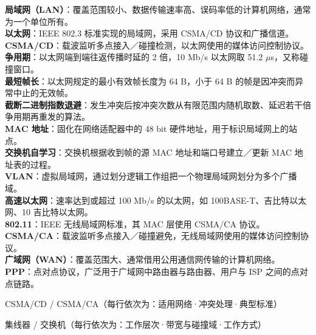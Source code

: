 \documentclass[a4paper,11pt]{article}
\begin{document}
\begin{keyterms}
\textbf{局域网（LAN）}：覆盖范围较小、数据传输速率高、误码率低的计算机网络，通常为一个单位所有。\\
\textbf{以太网}：IEEE 802.3 标准实现的局域网，采用 CSMA/CD 协议和广播信道。\\
\textbf{CSMA/CD}：载波监听多点接入／碰撞检测，以太网使用的媒体访问控制协议。\\
\textbf{争用期}：以太网端到端往返传播时延的 2 倍，10 Mb/s 以太网取 51.2 $\mu$s，又称碰撞窗口。\\
\textbf{最短帧长}：以太网规定的最小有效帧长度为 64 B，小于 64 B 的帧是因冲突而异常中止的无效帧。\\
\textbf{截断二进制指数退避}：发生冲突后按冲突次数从有限范围内随机取数、延迟若干倍争用期再重发的算法。\\
\textbf{MAC 地址}：固化在网络适配器中的 48 bit 硬件地址，用于标识局域网上的站点。\\
\textbf{交换机自学习}：交换机根据收到帧的源 MAC 地址和端口号建立／更新 MAC 地址表的过程。\\
\textbf{VLAN}：虚拟局域网，通过划分逻辑工作组把一个物理局域网划分为多个广播域。\\
\textbf{高速以太网}：速率达到或超过 100 Mb/s 的以太网，如 100BASE-T、吉比特以太网、10 吉比特以太网。\\
\textbf{802.11}：IEEE 无线局域网标准，其 MAC 层使用 CSMA/CA 协议。\\
\textbf{CSMA/CA}：载波监听多点接入／碰撞避免，无线局域网使用的媒体访问控制协议。\\
\textbf{广域网（WAN）}：覆盖范围大、通常借用公用通信网传输的计算机网络。\\
\textbf{PPP}：点对点协议，广泛用于广域网中路由器与路由器、用户与 ISP 之间的点对点链路。
\end{keyterms}

\begin{contrast}{CSMA/CD / CSMA/CA（每行依次为：适用网络·冲突处理·典型标准）}
\end{contrast}

\begin{contrast}{集线器 / 交换机（每行依次为：工作层次·带宽与碰撞域·工作方式）}
\end{contrast}
\end{document}
